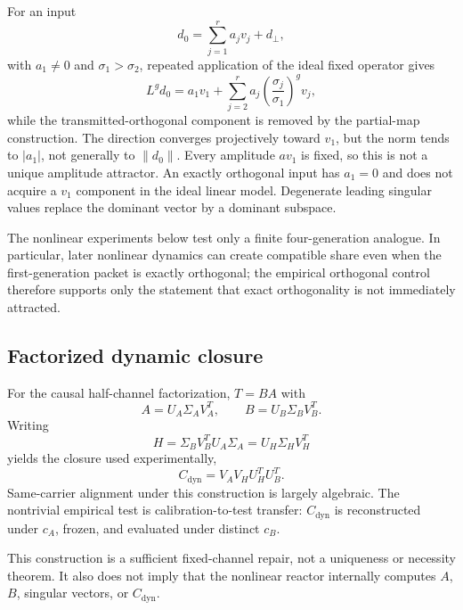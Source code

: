 \documentclass[aps,pre,preprint,superscriptaddress,nofootinbib]{revtex4-2}
\newcommand{\Cdyn}{C_{\mathrm{dyn}}}
\begin{document}
For an input
\begin{equation}
 d_0=\sum_{j=1}^{r}a_jv_j+d_\perp,
\end{equation}
with $a_1\neq0$ and $\sigma_1>\sigma_2$, repeated application of the ideal fixed operator gives
\begin{equation}
 L^gd_0=a_1v_1+\sum_{j=2}^{r}a_j\left(\frac{\sigma_j}{\sigma_1}\right)^gv_j,
\end{equation}
while the transmitted-orthogonal component is removed by the partial-map construction. The direction converges projectively toward $v_1$, but the norm tends to $|a_1|$, not generally to $\|d_0\|$. Every amplitude $av_1$ is fixed, so this is not a unique amplitude attractor. An exactly orthogonal input has $a_1=0$ and does not acquire a $v_1$ component in the ideal linear model. Degenerate leading singular values replace the dominant vector by a dominant subspace.

The nonlinear experiments below test only a finite four-generation analogue. In particular, later nonlinear dynamics can create compatible share even when the first-generation packet is exactly orthogonal; the empirical orthogonal control therefore supports only the statement that exact orthogonality is not immediately attracted.

\subsection{Factorized dynamic closure}

For the causal half-channel factorization, $T=BA$ with
\begin{equation}
 A=U_A\Sigma_AV_A^T,\qquad B=U_B\Sigma_BV_B^T.
\end{equation}
Writing
\begin{equation}
 H=\Sigma_BV_B^TU_A\Sigma_A=U_H\Sigma_HV_H^T
\end{equation}
yields the closure used experimentally,
\begin{equation}
 \Cdyn=V_AV_HU_H^TU_B^T.
\end{equation}
Same-carrier alignment under this construction is largely algebraic. The nontrivial empirical test is calibration-to-test transfer: $\Cdyn$ is reconstructed under $c_A$, frozen, and evaluated under distinct $c_B$.

This construction is a sufficient fixed-channel repair, not a uniqueness or necessity theorem. It also does not imply that the nonlinear reactor internally computes $A$, $B$, singular vectors, or $\Cdyn$.
\end{document}
